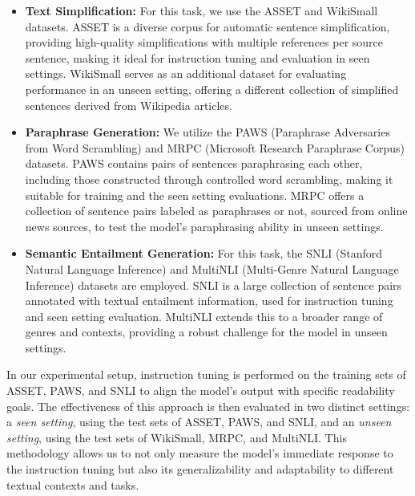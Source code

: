 \documentclass[11pt]{article}
\begin{document}
\begin{itemize}
[leftmargin=.1in,topsep=0.5pt]
\setlength\itemsep{0em}
\vspace{-0.2em}
    \item \textbf{Text Simplification:} For this task, we use the ASSET \cite{alva2020asset} and WikiSmall \cite{zhu2010monolingual} datasets. ASSET is a diverse corpus for automatic sentence simplification, providing high-quality simplifications with multiple references per source sentence, making it ideal for instruction tuning and evaluation in seen settings. WikiSmall serves as an additional dataset for evaluating performance in an unseen setting, offering a different collection of simplified sentences derived from Wikipedia articles.
    
    \item \textbf{Paraphrase Generation:} We utilize the PAWS \cite{zhang2019paws} (Paraphrase Adversaries from Word Scrambling) and MRPC (Microsoft Research Paraphrase Corpus) \cite{dolan2005automatically} datasets. PAWS contains pairs of sentences paraphrasing each other, including those constructed through controlled word scrambling, making it suitable for training and the seen setting evaluations. MRPC offers a collection of sentence pairs labeled as paraphrases or not, sourced from online news sources, to test the model's paraphrasing ability in unseen settings.
    
    \item \textbf{Semantic Entailment Generation:} For this task, the SNLI (Stanford Natural Language Inference) \cite{bowman2015large} and MultiNLI (Multi-Genre Natural Language Inference) \cite{williams2017broad} datasets are employed. SNLI is a large collection of sentence pairs annotated with textual entailment information, used for instruction tuning and seen setting evaluation. MultiNLI extends this to a broader range of genres and contexts, providing a robust challenge for the model in unseen settings.

\end{itemize}

In our experimental setup, instruction tuning is performed on the training sets of ASSET, PAWS, and SNLI to align the model's output with specific readability goals. The effectiveness of this approach is then evaluated in two distinct settings: a \textit{seen setting}, using the test sets of ASSET, PAWS, and SNLI, and an \textit{unseen setting}, using the test sets of WikiSmall, MRPC, and MultiNLI. This methodology allows us to not only measure the model's immediate response to the instruction tuning but also its generalizability and adaptability to different textual contexts and tasks.
\end{document}

